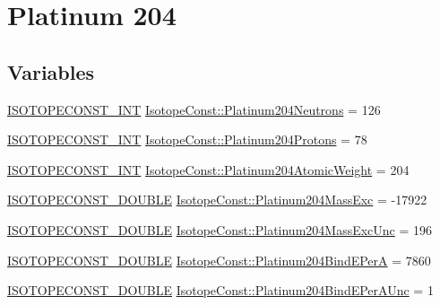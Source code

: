 \hypertarget{group___isotope_const-_platinum-_pt204}{}\section{Platinum 204}
\label{group___isotope_const-_platinum-_pt204}
\subsection*{Variables}
\begin{DoxyCompactItemize}
\item 
\mbox{\hyperlink{group___isotope_const-_macros_ga5f18360b3e99483a35c32d789e62621c}{I\+S\+O\+T\+O\+P\+E\+C\+O\+N\+S\+T\+\_\+\+I\+NT}} \mbox{\hyperlink{group___isotope_const-_platinum-_pt204_ga0aadce48c76dd4a898e0b2aa070bdd37}{Isotope\+Const\+::\+Platinum204\+Neutrons}} = 126
\item 
\mbox{\hyperlink{group___isotope_const-_macros_ga5f18360b3e99483a35c32d789e62621c}{I\+S\+O\+T\+O\+P\+E\+C\+O\+N\+S\+T\+\_\+\+I\+NT}} \mbox{\hyperlink{group___isotope_const-_platinum-_pt204_gaaae90989f4a4781618b6be0875527447}{Isotope\+Const\+::\+Platinum204\+Protons}} = 78
\item 
\mbox{\hyperlink{group___isotope_const-_macros_ga5f18360b3e99483a35c32d789e62621c}{I\+S\+O\+T\+O\+P\+E\+C\+O\+N\+S\+T\+\_\+\+I\+NT}} \mbox{\hyperlink{group___isotope_const-_platinum-_pt204_ga24b7c7b2c72e4bb507fc9652a4420faa}{Isotope\+Const\+::\+Platinum204\+Atomic\+Weight}} = 204
\item 
\mbox{\hyperlink{group___isotope_const-_macros_ga8f45a7272ce02c0b4c65c44636ed719a}{I\+S\+O\+T\+O\+P\+E\+C\+O\+N\+S\+T\+\_\+\+D\+O\+U\+B\+LE}} \mbox{\hyperlink{group___isotope_const-_platinum-_pt204_gaaf5b092f4316bd3d29977ab73511cef7}{Isotope\+Const\+::\+Platinum204\+Mass\+Exc}} = -\/17922
\item 
\mbox{\hyperlink{group___isotope_const-_macros_ga8f45a7272ce02c0b4c65c44636ed719a}{I\+S\+O\+T\+O\+P\+E\+C\+O\+N\+S\+T\+\_\+\+D\+O\+U\+B\+LE}} \mbox{\hyperlink{group___isotope_const-_platinum-_pt204_ga78fcfec714f026f3662ff4b8cef7aad1}{Isotope\+Const\+::\+Platinum204\+Mass\+Exc\+Unc}} = 196
\item 
\mbox{\hyperlink{group___isotope_const-_macros_ga8f45a7272ce02c0b4c65c44636ed719a}{I\+S\+O\+T\+O\+P\+E\+C\+O\+N\+S\+T\+\_\+\+D\+O\+U\+B\+LE}} \mbox{\hyperlink{group___isotope_const-_platinum-_pt204_ga6bb334cd488690ff3081e18a084638d3}{Isotope\+Const\+::\+Platinum204\+Bind\+E\+PerA}} = 7860
\item 
\mbox{\hyperlink{group___isotope_const-_macros_ga8f45a7272ce02c0b4c65c44636ed719a}{I\+S\+O\+T\+O\+P\+E\+C\+O\+N\+S\+T\+\_\+\+D\+O\+U\+B\+LE}} \mbox{\hyperlink{group___isotope_const-_platinum-_pt204_ga96ada28a36190435e2e5801086b58fe8}{Isotope\+Const\+::\+Platinum204\+Bind\+E\+Per\+A\+Unc}} = 1

\end{DoxyCompactItemize}
